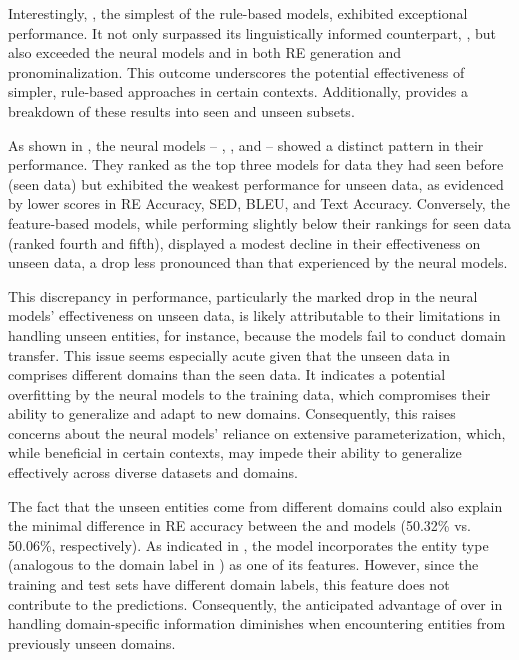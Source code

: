 Interestingly, , the simplest of the rule-based models, exhibited exceptional performance. It not only surpassed its linguistically informed counterpart, , but also exceeded the neural models  and  in both RE generation and pronominalization. This outcome underscores the potential effectiveness of simpler, rule-based approaches in certain contexts. Additionally,  provides a breakdown of these results into seen and unseen subsets.



As shown in , the neural models -- , , and  -- showed a distinct pattern in their performance. They ranked as the top three models for data they had seen before (seen data) but exhibited the weakest performance for unseen data, as evidenced by lower scores in RE Accuracy, SED, BLEU, and Text Accuracy. Conversely, the feature-based models, while performing slightly below their rankings for seen data (ranked fourth and fifth), displayed a modest decline in their effectiveness on unseen data, a drop less pronounced than that experienced by the neural models.

This discrepancy in performance, particularly the marked drop in the neural models' effectiveness on unseen data, is likely attributable to their limitations in handling unseen entities, for instance, because the models fail to conduct domain transfer. This issue seems especially acute given that the unseen data in \webnlg comprises different domains than the seen data. It indicates a potential overfitting by the neural models to the training data, which compromises their ability to generalize and adapt to new domains. Consequently, this raises concerns about the neural models' reliance on extensive parameterization, which, while beneficial in certain contexts, may impede their ability to generalize effectively across diverse datasets and domains.

The fact that the unseen entities come from different domains could also explain the minimal difference in RE accuracy between the  and  models (50.32\% vs. 50.06\%, respectively). As indicated in , the  model incorporates the entity type (analogous to the domain label in \webnlg) as one of its features. However, since the training and test sets have different domain labels, this feature does not contribute to the predictions. Consequently, the anticipated advantage of  over  in handling domain-specific information diminishes when encountering entities from previously unseen domains.

